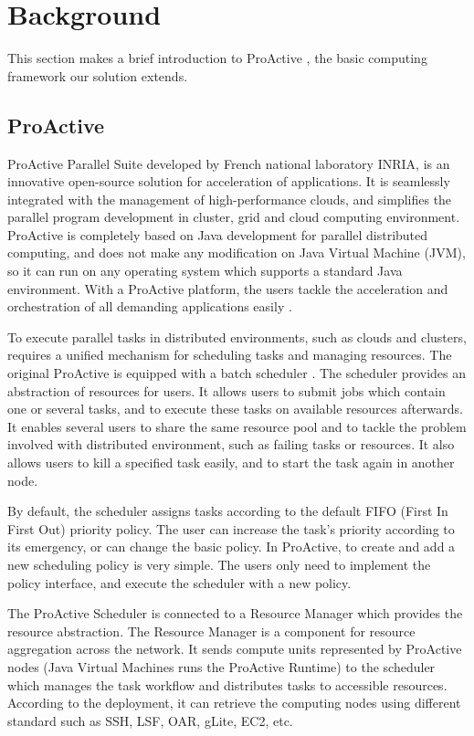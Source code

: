 \section{Background} \label{sec-background}

This section makes a brief introduction to ProActive \cite{huet04high}, the basic
computing framework our solution extends.

\subsection{ProActive}

ProActive Parallel Suite developed by French national laboratory INRIA, is an innovative
open-source solution for acceleration of applications. It is seamlessly integrated with
the management of high-performance clouds, and simplifies the parallel program development
in cluster, grid and cloud computing environment. ProActive is completely based on Java
development for parallel distributed computing, and does not make any modification on Java
Virtual Machine (JVM), so it can run on any operating system which supports a standard
Java environment. With a ProActive platform, the users tackle the acceleration and
orchestration of all demanding applications easily \cite{ProActive}.

To execute parallel tasks in distributed environments, such as clouds and clusters,
requires a unified mechanism for scheduling tasks and managing resources. The original
ProActive is equipped with a batch scheduler \cite{ProActiveScheduling}. The scheduler
provides an abstraction of resources for users. It allows users to submit jobs which contain
one or several tasks, and to execute these tasks on available resources afterwards. It enables
several users to share the same resource pool and to tackle the problem involved with
distributed environment, such as failing tasks or resources. It also allows users to kill a
specified task easily, and to start the task again in another node.

By default, the scheduler assigns tasks according to the default FIFO (First In First Out)
priority policy. The user can increase the task's priority according to its emergency,
or can change the basic policy. In ProActive, to create and add a new scheduling
policy is very simple. The users only need to implement the policy interface, and execute
the scheduler with a new policy.

The ProActive Scheduler \cite{pascheduling} is connected to a Resource Manager \cite{parm}
which provides the resource abstraction. The Resource Manager is a component for resource
aggregation across the network. It sends compute units represented by ProActive nodes
(Java Virtual Machines runs the ProActive Runtime) to the scheduler which manages the
task workflow and distributes tasks to accessible resources. According to the deployment,
it can retrieve the computing nodes using different standard such as SSH, LSF, OAR, gLite,
EC2, etc.

